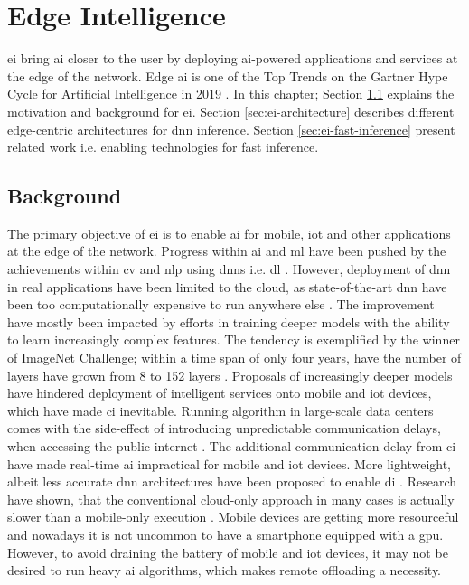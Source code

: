 \hypertarget{Edge Intelligence}{%
	\chapter{Edge Intelligence}\label{ch:edgeintelligence}}

\acrfull{ei} bring \gls{ai} closer to the user by deploying \gls{ai}-powered applications and services at the edge of the network. Edge \gls{ai} is one of the Top Trends on the Gartner Hype Cycle for Artificial Intelligence in 2019 \cite{goasduff_top_2019}. In this chapter; Section \ref{sec:ei-background} explains the motivation and background for \gls{ei}. Section \ref{sec:ei-architecture} describes different edge-centric architectures for \gls{dnn} inference. Section \ref{sec:ei-fast-inference} present related work i.e. enabling technologies for fast inference.

\section{Background}\label{sec:ei-background}

The primary objective of \gls{ei} is to enable \gls{ai} for mobile, \gls{iot} and other applications at the edge of the network. Progress within \gls{ai} and \gls{ml} have been pushed by the achievements within \acrfull{cv} and \gls{nlp} using \gls{dnn}s i.e. \gls{dl} \cite{stoica_berkeley_2017}. However, deployment of \gls{dnn} in real applications have been limited to the cloud, as state-of-the-art \gls{dnn} have been too computationally expensive to run anywhere else \cite{zhou_edge_2019}. The improvement have mostly been impacted by efforts in training deeper models with the ability to learn increasingly complex features. The tendency is exemplified by the winner of ImageNet Challenge; within a time span of only four years, have the number of layers have grown from 8 to 152 layers \cite{russakovsky_imagenet_2015}. Proposals of increasingly deeper models have hindered deployment of intelligent services onto mobile and \gls{iot} devices, which have made \gls{ci} inevitable. Running algorithm in large-scale data centers comes with the side-effect of introducing unpredictable communication delays, when accessing the public internet \cite{shi_edge_2016}. The additional communication delay from \gls{ci} have made real-time \gls{ai} impractical for mobile and \gls{iot} devices. More lightweight, albeit less accurate \gls{dnn} architectures have been proposed to enable \gls{di} \cite{chen_deep_2019}. Research have shown, that the conventional cloud-only approach in many cases is actually slower than a mobile-only execution \cite{kang_neurosurgeon:_2017}. Mobile devices are getting more resourceful and nowadays it is not uncommon to have a smartphone equipped with a \gls{gpu}. However, to avoid draining the battery of mobile and \gls{iot} devices, it may not be desired to run heavy \gls{ai} algorithms, which makes remote offloading a necessity. 

